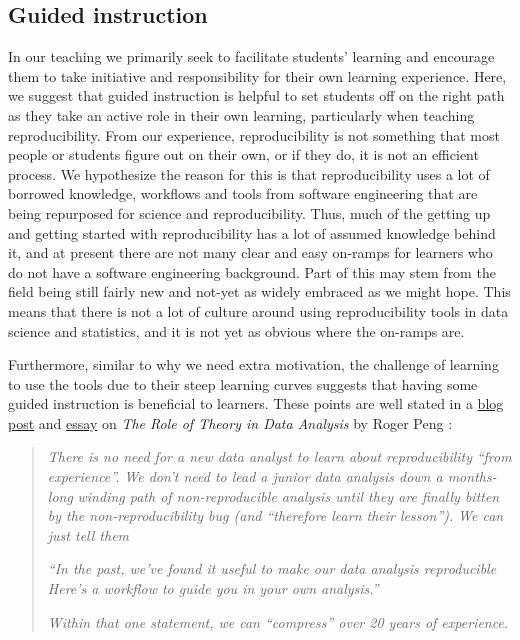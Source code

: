 \documentclass[
  12 pt,
]{paper}
\begin{document}
\hypertarget{guided-instruction}{%
\subsection{Guided instruction}\label{guided-instruction}}

In our teaching
we primarily seek to facilitate students' learning
and encourage them to take initiative and responsibility for their own learning experience.
Here, we suggest that guided instruction is helpful
to set students off on the right path as they take an active role in their own learning,
particularly when teaching reproducibility.
From our experience, reproducibility is not something that most people or
students figure out on their own,
or if they do, it is not an efficient process.
We hypothesize the reason for this is that reproducibility
uses a lot of borrowed knowledge, workflows
and tools from software engineering that are
being repurposed for science and reproducibility.
Thus, much of the getting up and getting started with reproducibility
has a lot of assumed knowledge behind it,
and at present there are not many clear and easy on-ramps for learners who
do not have a software engineering background.
Part of this may stem from the field being still fairly new
and not-yet as widely embraced as we might hope.
This means that there is not a lot of culture around using reproducibility tools in data science
and statistics, and it is not yet as obvious where the on-ramps are.

Furthermore, similar to why we need extra motivation,
the challenge of learning to use the tools due to their steep learning curves
suggests that having some guided instruction is beneficial to learners.
These points are well stated in a
\href{https://simplystatistics.org/2018/12/11/the-role-of-theory-in-data-analysis/}{blog post}
and \href{https://leanpub.com/dataanalysisessays}{essay}
on \emph{The Role of Theory in Data Analysis} by Roger Peng \autocite*{peng2020essays}:

\begin{quote}
\emph{There is no need for a new data analyst to learn about reproducibility}
\emph{``from experience''.}
\emph{We don't need to lead a junior data analysis down a months-long}
\emph{winding path of non-reproducible analysis until they are finally bitten}
\emph{by the non-reproducibility bug (and ``therefore learn their lesson'').}
\emph{We can just tell them}

\emph{``In the past, we've found it useful to make our data analysis reproducible\emph{
}Here's a workflow to guide you in your own analysis.''}

\emph{Within that one statement, we can ``compress'' over 20 years of experience.}
\end{quote}
\end{document}
